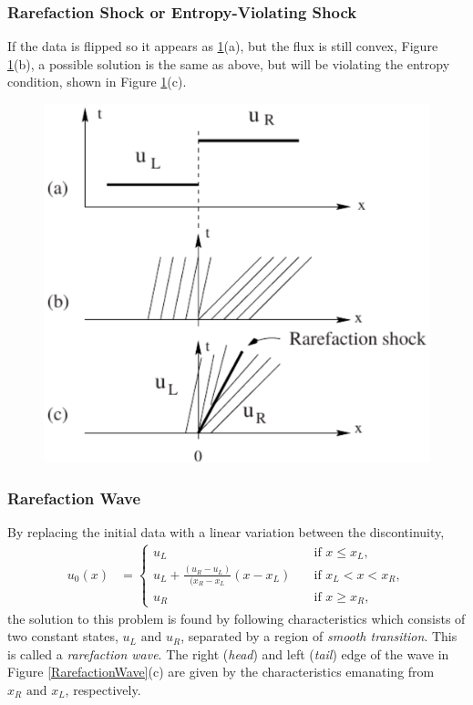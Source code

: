 \documentclass[]{article}
\begin{document}
		\subsubsection{Rarefaction Shock or Entropy-Violating Shock}
		If the data is flipped so it appears as \ref{RarefactionShock}(a), but the flux is still convex, Figure \ref{RarefactionShock}(b), a possible solution is the same as above, but will be violating the entropy condition, shown in Figure \ref{RarefactionShock}(c).
		
		\begin{figure}[h] 	
			\centering
			\includegraphics[scale=.55]{RarefactionShock}
			\caption{}
			\label{RarefactionShock}
		\end{figure}
		
		\subsubsection{Rarefaction Wave}
		By replacing the initial data with a linear variation between the discontinuity,
		\begin{equation}
		\begin{aligned}
		u_0(x) &= \left\{
		\begin{array}{ll}
		u_L & \quad \mbox{if } x \leq x_L, \\
		u_L + \frac{(u_R - u_L)}{(x_R - x_L} (x - x_L)  & \quad \mbox{if } x_L < x < x_R, \\
		u_R & \quad \mbox{if } x \geq x_R,
		\end{array}
		\right.
		\end{aligned}
		\end{equation}
		the solution to this problem is found by following characteristics which consists of two constant states, $ u_L \mbox{ and } u_R $, separated by a region of \textit{smooth transition}. This is called a \textit{rarefaction wave}. The right (\textit{head}) and left (\textit{tail}) edge of the wave in Figure \ref{RarefactionWave}(c) are given by the characteristics emanating from $ x_R \mbox{ and } x_L$, respectively. 
		
\end{document}
